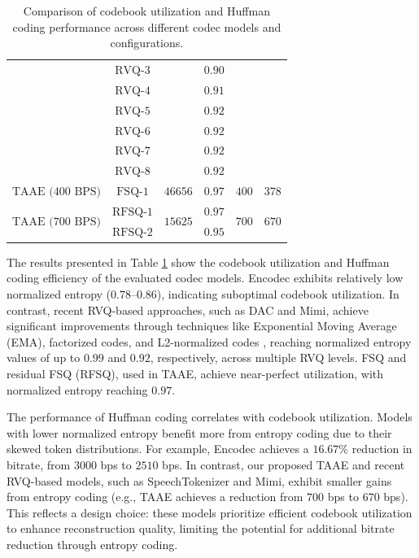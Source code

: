 \documentclass{article} %
\begin{document}
\begin{table}[t]
{\begin{tabular}{cccccc}
    & $\text{RVQ-3}$ &                        & $0.90$ &                        &   \\ 
    & $\text{RVQ-4}$ &                        & $0.91$ &                        &  \\ 
    & $\text{RVQ-5}$ &                        & $0.92$ &                        &   \\ 
    & $\text{RVQ-6}$ &                        & $0.92$ &                        &   \\ 
    & $\text{RVQ-7}$ &                        & $0.92$ &                        &  \\ 
    & $\text{RVQ-8}$ &                        & $0.92$ &                        &   \\ \midrule
$\text{TAAE (400 BPS)}$ & $\text{FSQ-1}$ & $46656$ & $0.97$ & $400$ & $378$ \\ \midrule
\multirow{2}{*}{$\text{TAAE (700 BPS)}$} 
    & $\text{RFSQ-1}$ & \multirow{2}{*}{$15625$}            & $0.97$ & \multirow{2}{*}{$700$}  & \multirow{2}{*}{$670$}  \\ 
    & $\text{RFSQ-2}$ &           & $0.95$ &                   \\ \midrule\end{tabular}}
\caption{Comparison of codebook utilization and Huffman coding performance across different codec models and configurations.}
\label{tab:huffman}
\end{table}

The results presented in Table \ref{tab:huffman} show the codebook utilization and Huffman coding efficiency of the evaluated codec models. Encodec exhibits relatively low normalized entropy ($0.78–0.86$), indicating suboptimal codebook utilization. In contrast, recent RVQ-based approaches, such as DAC and Mimi, achieve significant improvements through techniques like Exponential Moving Average (EMA), factorized codes, and L2-normalized codes \citep{yu2021vector}, reaching normalized entropy values of up to $0.99$ and $0.92$, respectively, across multiple RVQ levels. FSQ and residual FSQ (RFSQ), used in TAAE, achieve near-perfect utilization, with normalized entropy reaching $0.97$.

The performance of Huffman coding correlates with codebook utilization. Models with lower normalized entropy benefit more from entropy coding due to their skewed token distributions. For example, Encodec achieves a $16.67$\% reduction in bitrate, from $3000$ bps to $2510$ bps. In contrast, our proposed TAAE and recent RVQ-based models, such as SpeechTokenizer and Mimi, exhibit smaller gains from entropy coding (e.g., TAAE achieves a reduction from $700$ bps to $670$ bps). This reflects a design choice: these models prioritize efficient codebook utilization to enhance reconstruction quality, limiting the potential for additional bitrate reduction through entropy coding.
\end{document}
